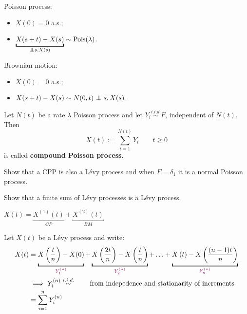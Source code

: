 \documentclass[class=article,crop=false]{standalone}
\begin{document}
\begin{example}
	Poisson process:
	\begin{itemize}
		\item $X(0)=0$ a.s.;
		\item $\underbracket{X(s+t)-X(s)}_{\mathclap{\independent s,X(s)}}\sim\text{Pois}(\lambda)$.
	\end{itemize}
	Brownian motion:
	\begin{itemize}
	\item $X(0)=0$ a.s.;
	\item $X(s+t)-X(s)\sim N(0,t)\independent s,X(s)$.
	\end{itemize}
\end{example}
\begin{definition}
	Let $N(t)$ be a rate $\lambda$ Poisson process and let $Y_i\stackrel{i.i.d.}{\sim}F$, independent of $N(t)$. Then
	\[X(t):=\sum_{i=1}^{N(t)}Y_i\qquad t\geqslant 0\] 
	is called \textbf{compound Poisson process}.
\end{definition}
\begin{exercise}
	Show that a CPP is also a L\'evy process and when $F=\delta_1$ it is a normal Poisson process.
\end{exercise}
\begin{figure}[H]
	\centering
	
\end{figure}
\begin{exercise}
	Show that a finite sum of L\'evy processes is a L\'evy process.
\end{exercise}
\begin{example}
	$X(t)=\underbracket{X^{(1)}(t)}_{CP}+\underbracket{X^{(2)}(t)}_{BM}$
	\begin{figure}[H]
		\centering
		
	\end{figure}
	\begin{figure}[H]
		\centering
		
	\end{figure}
\end{example}
Let $X(t)$ be a L\'evy process and write:
\begin{align*}
	X(t)&=\underbracket{X\left(\frac{t}{n}\right)-X(0)}_{\mathclap{\textcolor{RedViolet}{Y_1^{(n)}}}}+\underbracket{X\left(\frac{2t}{n}\right)-X\left(\frac{t}{n} \right) }_{\mathclap{\textcolor{RedViolet}{Y_2^{(n)}}}}+\ldots+\underbracket{X\left(t\right)-X\left(\frac{(n-1)t}{n} \right) }_{\mathclap{\textcolor{RedViolet}{Y_n^{(n)}}}}\\
	&\implies Y_i^{(n)}\stackrel{i.i.d.}{\sim}\qquad\text{from indepedence and stationarity of increments}\\
	&=\sum_{i=1}^{n}Y_i^{(n)}
\end{align*}
\end{document}
